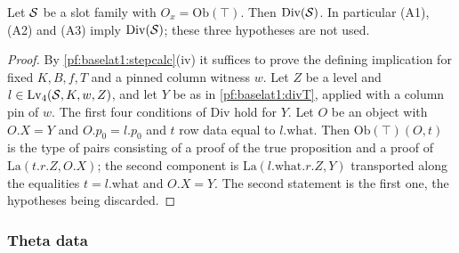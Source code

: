 \begin{lemma}\label{pf:baselat1:divprov}
Let $\mathcal S$ be a slot family with $O_x=\mathrm{Ob}(\top)$. Then $\mathrm{Div}(\mathcal S)$. In particular
(A1), (A2) and (A3) imply $\mathrm{Div}(\mathcal S)$; these three hypotheses are not used.
\end{lemma}

\begin{proof}
By \cref{pf:baselat1:stepcalc}(iv) it suffices to prove the defining implication for fixed $K,B,f,T$ and a pinned
column witness $w$. Let $Z$ be a level and $l\in\mathrm{Lv}_4(\mathcal S,K,w,Z)$, and let $Y$ be as in
\cref{pf:baselat1:divT}, applied with a column pin of $w$. The first four conditions of $\mathrm{Div}$ hold for $Y$.
Let $O$ be an object with $O.X=Y$ and $O.p_0=l.p_0$ and $t$ row data equal to $l.\mathrm{what}$. Then
$\mathrm{Ob}(\top)(O,t)$ is the type of pairs consisting of a proof of the true proposition and a proof of
$\mathrm{La}(t.r.Z,O.X)$; the second component is $\mathrm{La}(l.\mathrm{what}.r.Z,Y)$ transported along the
equalities $t=l.\mathrm{what}$ and $O.X=Y$. The second statement is the first one, the hypotheses being discarded.
\end{proof}

\subsubsection{Theta data}\label{pf:baselat1:sssec:thetaproofs}

